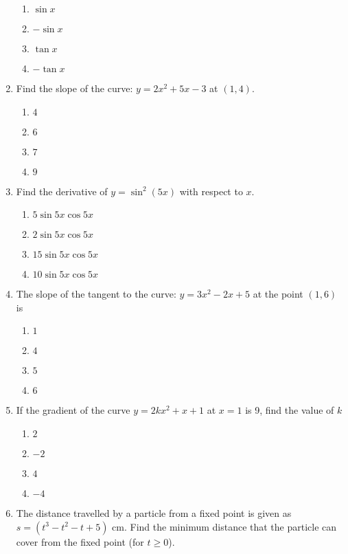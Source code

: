 \begin{multicols}{2}
\begin{enumerate}[label={\arabic*.}]
      \begin{enumerate}[label={\Alph*.}]
        \item \(\sin{x}\)
        \item \(-\sin{x}\)
        \item \(\tan{x}\)
        \item \(-\tan{x}\)
      \end{enumerate}
    \item Find the slope of the curve: \(y = 2{x}^{2}+ 5{x}-3\) at \((1,4)\).
      \begin{enumerate}[label={\Alph*.}]
        \item \(4\)
        \item \(6\)
        \item \(7\)
        \item \(9\)
      \end{enumerate}
    \item Find the derivative of \(y = \sin^{2}{(5x)}\) with respect to \(x\).
      \begin{enumerate}[label={\Alph*.}]
        \item \(5 \sin{5x\cos{5x}}\)
        \item \(2 \sin{5x\cos{5x}}\)
        \item \(15 \sin{5x\cos{5x}}\)
        \item \(10 \sin{5x\cos{5x}}\)
      \end{enumerate}
    \item The slope of the tangent to the curve: \(y = 3{x}^{2}-2x+5\) at the point \((1,6)\) is
      \begin{enumerate}[label={\Alph*.}]
        \item \(1\)
        \item \(4\)
        \item \(5\)
        \item \(6\)
      \end{enumerate}
    \item If the gradient of the curve \(y = 2k{x}^{2} + x + 1\) at \(x = 1\) is 9, find the value of \(k\)
      \begin{enumerate}[label={\Alph*.}]
        \item \(2\)
        \item \(-2\)
        \item \(4\)
        \item \(-4\)
      \end{enumerate}
    \item The distance travelled by a particle from a fixed point is given as \(s = \left({t}^{3} - {t}^{2} - t + 5\right)\) cm. Find the minimum distance that the particle can cover from the fixed point (for \(t \ge 0\)).

\end{enumerate}
\end{multicols}
